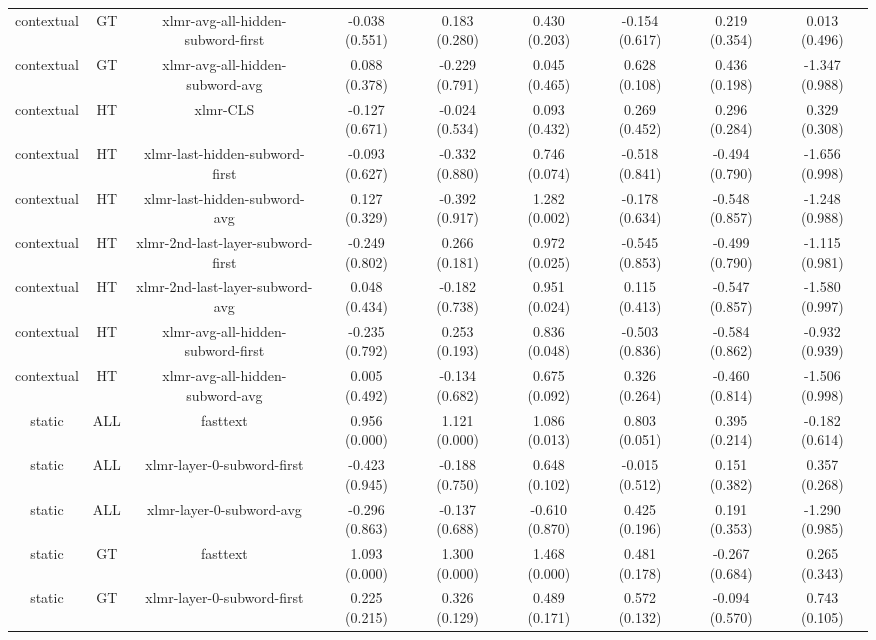 \begin{sidewaystable}[htb]
\begin{tabular}{@{}ccccccccc@{}}
        contextual & GT & xlmr-avg-all-hidden-subword-first & -0.038 (0.551) & 0.183 (0.280) & 0.430 (0.203) & -0.154 (0.617) & 0.219 (0.354) & 0.013 (0.496) \\
        contextual & GT & xlmr-avg-all-hidden-subword-avg & 0.088 (0.378) & -0.229 (0.791) & 0.045 (0.465) & 0.628 (0.108) & 0.436 (0.198) & -1.347 (0.988) \\
        contextual & HT & xlmr-CLS & -0.127 (0.671) & -0.024 (0.534) & 0.093 (0.432) & 0.269 (0.452) & 0.296 (0.284) & 0.329 (0.308) \\
        contextual & HT & xlmr-last-hidden-subword-first & -0.093 (0.627) & -0.332 (0.880) & 0.746 (0.074) & -0.518 (0.841) & -0.494 (0.790) & -1.656 (0.998) \\
        contextual & HT & xlmr-last-hidden-subword-avg & 0.127 (0.329) & -0.392 (0.917) & 1.282 (0.002) & -0.178 (0.634) & -0.548 (0.857) & -1.248 (0.988) \\
        contextual & HT & xlmr-2nd-last-layer-subword-first & -0.249 (0.802) & 0.266 (0.181) & 0.972 (0.025) & -0.545 (0.853) & -0.499 (0.790) & -1.115 (0.981) \\
        contextual & HT & xlmr-2nd-last-layer-subword-avg & 0.048 (0.434) & -0.182 (0.738) & 0.951 (0.024) & 0.115 (0.413) & -0.547 (0.857) & -1.580 (0.997) \\
        contextual & HT & xlmr-avg-all-hidden-subword-first & -0.235 (0.792) & 0.253 (0.193) & 0.836 (0.048) & -0.503 (0.836) & -0.584 (0.862) & -0.932 (0.939) \\
        contextual & HT & xlmr-avg-all-hidden-subword-avg & 0.005 (0.492) & -0.134 (0.682) & 0.675 (0.092) & 0.326 (0.264) & -0.460 (0.814) & -1.506 (0.998) \\
        static & ALL & fasttext & 0.956 (0.000) & 1.121 (0.000) & 1.086 (0.013) & 0.803 (0.051) & 0.395 (0.214) & -0.182 (0.614) \\
        static & ALL & xlmr-layer-0-subword-first & -0.423 (0.945) & -0.188 (0.750) & 0.648 (0.102) & -0.015 (0.512) & 0.151 (0.382) & 0.357 (0.268) \\
        static & ALL & xlmr-layer-0-subword-avg & -0.296 (0.863) & -0.137 (0.688) & -0.610 (0.870) & 0.425 (0.196) & 0.191 (0.353) & -1.290 (0.985) \\
        static & GT & fasttext & 1.093 (0.000) & 1.300 (0.000) & 1.468 (0.000) & 0.481 (0.178) & -0.267 (0.684) & 0.265 (0.343) \\
        static & GT & xlmr-layer-0-subword-first & 0.225 (0.215) & 0.326 (0.129) & 0.489 (0.171) & 0.572 (0.132) & -0.094 (0.570) & 0.743 (0.105) \\

\end{tabular}
\end{sidewaystable}
